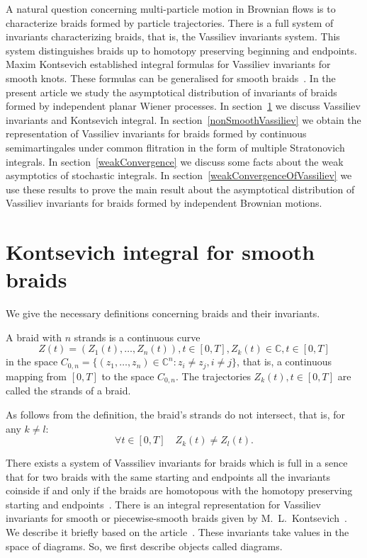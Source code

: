 \documentclass[12pt, a4paper, titlepage]{article}
\begin{document}
A natural question concerning multi-particle motion in Brownian flows is 
to characterize braids formed by particle trajectories. 
There is a full system of invariants characterizing braids, 
that is, the Vassiliev invariants system. 
This system distinguishes braids up to homotopy preserving beginning and endpoints.
Maxim Kontsevich established integral formulas for Vassiliev invariants
for smooth knots. These formulas can be generalised for smooth braids~\cite{Berger}. 
In the present article we study the asymptotical distribution of invariants of braids
formed by independent planar Wiener processes. 
In section~\ref{SmoothKontsevich} we discuss Vassiliev invariants and Kontsevich integral.
In section~\ref{nonSmoothVassiliev} we obtain the representation of Vassiliev
invariants for braids formed by continuous semimartingales under common flitration
in the form of multiple Stratonovich integrals. In section~\ref{weakConvergence}
we discuss some facts about the weak asymptotics of stochastic integrals.
In section~\ref{weakConvergenceOfVassiliev} we use these results to 
prove the main result about the asymptotical distribution of Vassiliev invariants
for braids formed by independent Brownian motions. 

\section{Kontsevich integral for smooth braids}\label{SmoothKontsevich}
We give the necessary definitions concerning braids and their  invariants.

\begin{definition}\cite{Berger}
 A braid with $n$ strands is a continuous curve
\begin{equation}\nonumber
Z(t)=(Z_1(t),\dots,Z_n(t)), t\in [0,T], Z_k(t)\in \mathbb{C}, t\in [0,T]
\end{equation}
in the space 
$C_{0,n}=\{(z_1,\ldots, z_n)\in\mathbb{C}^n:z_i\ne z_j, i\ne j\}$, that is,
a continuous mapping from $[0,T]$ to the space $C_{0,n}$.
The trajectories $Z_k(t), t\in [0,T]$ are called the strands of a braid.
\end{definition}
As follows from the definition, the braid's strands do not intersect, that is,
for any $k\ne l$: 
$$\forall t\in [0, T] \quad Z_k(t)\ne Z_l(t).$$

There exists a system of Vasssiliev invariants for braids
which is full in a sence that for two braids with the same starting and endpoints
all the invariants coinside if and only if the braids are homotopous
with the homotopy preserving starting and endpoints~\cite{BarNatan}. 
There is an integral representation for Vassiliev invariants
for smooth or piecewise-smooth braids
given by M.~L.~Kontsevich~\cite{Kontsevich}. 
We describe it briefly based on the article~\cite{Berger}. 
These invariants take values in the space of diagrams. 
So, we first describe objects called diagrams. 
\end{document}
